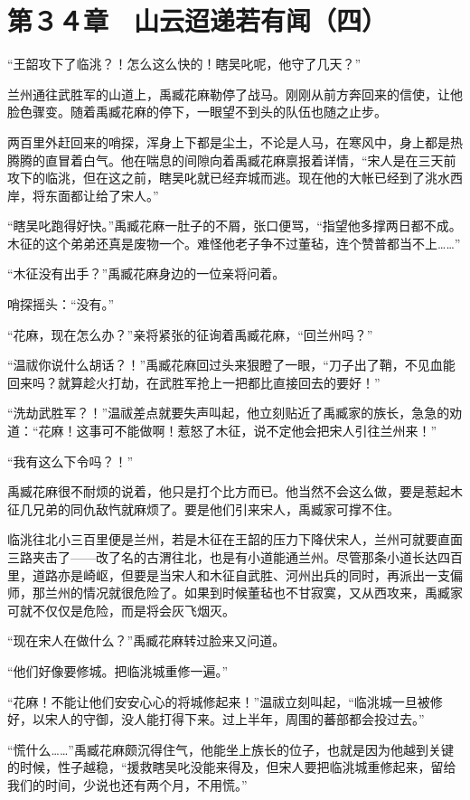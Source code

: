 \section{第３４章　山云迢递若有闻（四）}

“王韶攻下了临洮？！怎么这么快的！瞎吴叱呢，他守了几天？”

兰州通往武胜军的山道上，禹臧花麻勒停了战马。刚刚从前方奔回来的信使，让他脸色骤变。随着禹臧花麻的停下，一眼望不到头的队伍也随之止步。

两百里外赶回来的哨探，浑身上下都是尘土，不论是人马，在寒风中，身上都是热腾腾的直冒着白气。他在喘息的间隙向着禹臧花麻禀报着详情，“宋人是在三天前攻下的临洮，但在这之前，瞎吴叱就已经弃城而逃。现在他的大帐已经到了洮水西岸，将东面都让给了宋人。”

“瞎吴叱跑得好快。”禹臧花麻一肚子的不屑，张口便骂，“指望他多撑两日都不成。木征的这个弟弟还真是废物一个。难怪他老子争不过董毡，连个赞普都当不上……”

“木征没有出手？”禹臧花麻身边的一位亲将问着。

哨探摇头：“没有。”

“花麻，现在怎么办？”亲将紧张的征询着禹臧花麻，“回兰州吗？”

“温祓你说什么胡话？！”禹臧花麻回过头来狠瞪了一眼，“刀子出了鞘，不见血能回来吗？就算趁火打劫，在武胜军抢上一把都比直接回去的要好！”

“洗劫武胜军？！”温祓差点就要失声叫起，他立刻贴近了禹臧家的族长，急急的劝道：“花麻！这事可不能做啊！惹怒了木征，说不定他会把宋人引往兰州来！”

“我有这么下令吗？！”

禹臧花麻很不耐烦的说着，他只是打个比方而已。他当然不会这么做，要是惹起木征几兄弟的同仇敌忾就麻烦了。要是他们引来宋人，禹臧家可撑不住。

临洮往北小三百里便是兰州，若是木征在王韶的压力下降伏宋人，兰州可就要直面三路夹击了——改了名的古渭往北，也是有小道能通兰州。尽管那条小道长达四百里，道路亦是崎岖，但要是当宋人和木征自武胜、河州出兵的同时，再派出一支偏师，那兰州的情况就很危险了。如果到时候董毡也不甘寂寞，又从西攻来，禹臧家可就不仅仅是危险，而是将会灰飞烟灭。

“现在宋人在做什么？”禹臧花麻转过脸来又问道。

“他们好像要修城。把临洮城重修一遍。”

“花麻！不能让他们安安心心的将城修起来！”温祓立刻叫起，“临洮城一旦被修好，以宋人的守御，没人能打得下来。过上半年，周围的蕃部都会投过去。”

“慌什么……”禹臧花麻颇沉得住气，他能坐上族长的位子，也就是因为他越到关键的时候，性子越稳，“援救瞎吴叱没能来得及，但宋人要把临洮城重修起来，留给我们的时间，少说也还有两个月，不用慌。”

